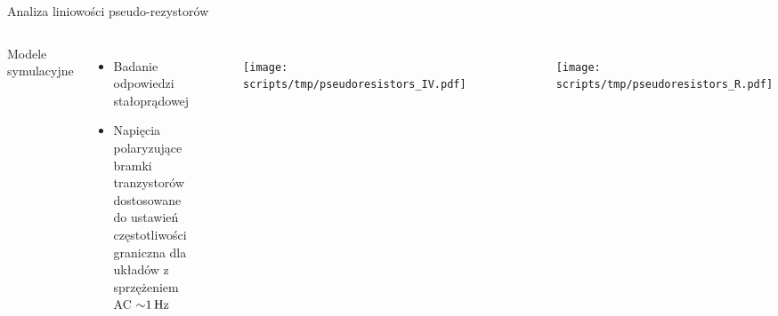 \begin{frame}{Analiza liniowości pseudo-rezystorów}
\begin{columns}
\begin{block}{Modele symulacyjne}
\end{block}
        \begin{itemize}
            \item Badanie odpowiedzi stałoprądowej  
            \item Napięcia polaryzujące bramki tranzystorów dostosowane do ustawień  częstotliwości graniczna dla układów z sprzężeniem AC $\SI{\sim 1}{\hertz}$

        \end{itemize}
    \begin{columns}

        \begin{figure}[H]
            \centering
            \texttt{[image: scripts/tmp/pseudoresistors\_IV.pdf]}
        \end{figure}


        \begin{figure}[H]
            \centering
            \texttt{[image: scripts/tmp/pseudoresistors\_R.pdf]}
        \end{figure}

    \end{columns}
\end{columns}


\end{frame}

